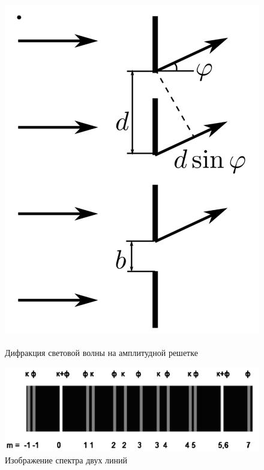 \documentclass[a4paper,12pt]{article}
\theoremstyle{plain} %
\theoremstyle{definition} %
\theoremstyle{remark} %
\begin{document}
\begin{figure}[h!]
	\begin{center}
		\begin{minipage}[h]{0.3\linewidth}
			\includegraphics[width=1\linewidth]{p2.png}
			\caption{Дифракция световой волны на амплитудной решетке} 
			\label{p2}
		\end{minipage}
		\hfill 
		\begin{minipage}[h]{0.45\linewidth}
			\includegraphics[width=1\linewidth]{p3.png}
			\caption{Изображение спектра двух линий}
			\label{p3}
		\end{minipage}
	\end{center}
\end{figure}
\end{document}
